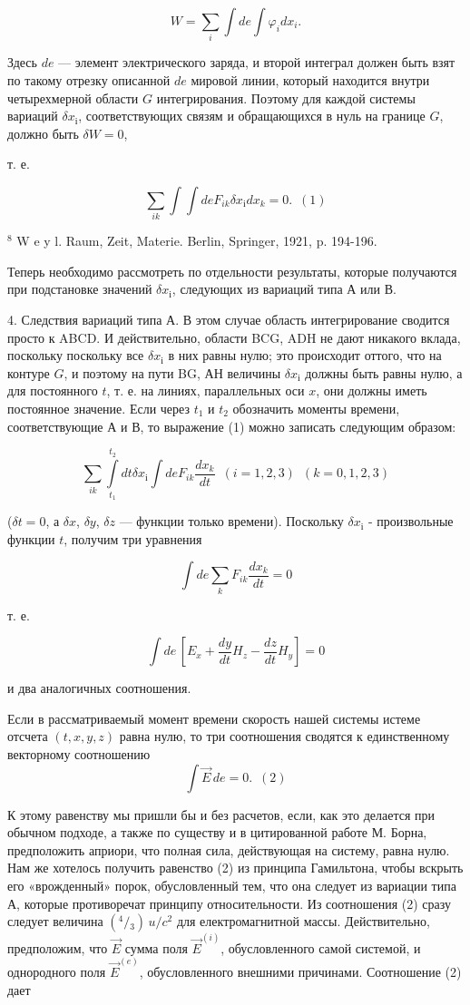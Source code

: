 \documentclass[11pt]{article}
\begin{document}
\[W=\sum_i\int de \int \varphi_i dx_i.\]

    Здесь \(de\) --- элемент электрического заряда, и второй интеграл должен
быть взят по такому отрезку описанной \(de\) мировой линии, который
находится внутри четырехмерной области \(G\) интегрирования. Поэтому для
каждой системы вариаций \(\delta {{x}_{і}}\), соответствующих связям и
обращающихся в нуль на границе \(G\), должно быть \(\delta W = 0\),

    т. е.

\[\sum_{ik} \int \int de F_{ik} \delta {{x}_{і}} dx_{k} = 0. \,\,\,(1)\]

    \(^8\) W e y l. Raum, Zeit, Materie. Berlin, Springer, 1921, p. 194-196.

    Теперь необходимо рассмотреть по отдельности результаты, которые
получаются при подстановке значений \(\delta {{x}_{і}}\), следующих из
вариаций типа А или В.

    4. Следствия вариаций типа А. В этом случае область интегрирование
сводится просто к ABCD. И действительно, области BCG, ADH не дают
никакого вклада, поскольку поскольку все \(\delta {{x}_{і}}\) в них равны
нулю; это происходит оттого, что на контуре \(G\), и поэтому на пути BG,
АН величины \(\delta {{x}_{і}}\) должны быть равны нулю, а для постоянного
\(t\), т. е. на линиях, параллельных оси \(x\), они должны иметь
постоянное значение. Если через \(t_1\) и \(t_2\) обозначить моменты
времени, соответствующие А и В, то выражение (1) можно записать
следующим образом:

\[\sum_{ik} \int\limits_{t_1}^{t_2} dt \delta {{x}_{і}} \int de F_{ik}  \frac{dx_{k}}{dt} \,\,\,(i = 1,2,3)\,\,\,(k = 0,1,2,3)\]

(\(\delta t = 0\), а \(\delta x\), \(\delta y\), \(\delta z\) ---
функции только времени). Поскольку \(\delta {{x}_{і}}\) - произвольные функции
\(t\), получим три уравнения

\[\int de \sum_{k} F_{ik}  \frac{dx_{k}}{dt} = 0\]

т. е.

\[\int de \, \left[ E_{x}  + \frac{dy}{dt} H_{z} - \frac{dz}{dt} H_{y} \right]= 0\]

и два аналогичных соотношения.

    Если в рассматриваемый момент времени скорость нашей системы истеме
отсчета \((t, x, y, z)\) равна нулю, то три соотношения сводятся к
единственному векторному соотношению
\[\int \vec {E} \, de = 0. \,\,\, (2)\]

    К этому равенству мы пришли бы и без расчетов, если, как это делается
при обычном подходе, а также по существу и в цитированной работе М.
Борна, предположить априори, что полная сила, действующая на систему,
равна нулю. Нам же хотелось получить равенство (2) из принципа
Гамильтона, чтобы вскрыть его «врожденный» порок, обусловленный тем, что
она следует из вариации типа А, которые противоречат принципу
относительности. Из соотношения (2) сразу следует величина
\(\left({}^{4} \big /{}_{3}\right) \, u/c^2\) для електромагнитной
массы. Действительно, предположим, что \(\vec {E}\) сумма поля
\({\vec {E}}^{(i)}\), обусловленного самой системой, и однородного поля
\({\vec {E}}^{(e)}\), обусловленного внешними причинами. Соотношение (2)
дает
\end{document}
